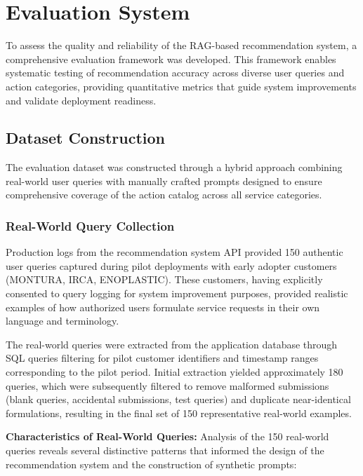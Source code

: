 \section{Evaluation System}
To assess the quality and reliability of the RAG-based recommendation system, a comprehensive evaluation framework was developed. This framework enables systematic testing of recommendation accuracy across diverse user queries and action categories, providing quantitative metrics that guide system improvements and validate deployment readiness.

\subsection{Dataset Construction}

The evaluation dataset was constructed through a hybrid approach combining real-world user queries with manually crafted prompts designed to ensure comprehensive coverage of the action catalog across all service categories.

\subsubsection{Real-World Query Collection}

Production logs from the recommendation system API provided 150 authentic user queries captured during pilot deployments with early adopter customers (MONTURA, IRCA, ENOPLASTIC). These customers, having explicitly consented to query logging for system improvement purposes, provided realistic examples of how authorized users formulate service requests in their own language and terminology.

The real-world queries were extracted from the application database through SQL queries filtering for pilot customer identifiers and timestamp ranges corresponding to the pilot period. Initial extraction yielded approximately 180 queries, which were subsequently filtered to remove malformed submissions (blank queries, accidental submissions, test queries) and duplicate near-identical formulations, resulting in the final set of 150 representative real-world examples.

\textbf{Characteristics of Real-World Queries:} Analysis of the 150 real-world queries reveals several distinctive patterns that informed the design of the recommendation system and the construction of synthetic prompts:


